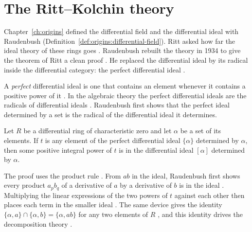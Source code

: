 \section{The Ritt--Kolchin theory}\label{sec:differential-algebra:ritt-kolchin}

Chapter~\ref{ch:origins} defined the differential field and the
differential ideal with Raudenbush
(Definition~\ref{def:origins:differential-field}). Ritt asked how far the
ideal theory of these rings goes \cite[p.~361]{Raudenbush1934}.
Raudenbush rebuilt the theory in 1934 to give the theorem of Ritt a
clean proof \cite[p.~361]{Raudenbush1934}. He replaced the differential
ideal by its radical inside
the differential category: the perfect differential ideal
\cite[p.~361]{Raudenbush1934}.

A \emph{perfect} differential ideal is one that contains an element
whenever it contains a positive power of it
\cite[p.~362]{Raudenbush1934}. In the algebraic theory the perfect
differential ideals are the radicals of differential ideals
\cite[p.~362]{Raudenbush1934}. Raudenbush first shows that the perfect
ideal determined by a set is the radical of the differential ideal it
determines.

\begin{theorem}\label{thm:diffalg:perfect-is-radical}
Let $R$ be a differential ring of characteristic zero and let
$\alpha$ be a set of its elements. If $t$ is any element of the perfect
differential ideal $\{\alpha\}$ determined by $\alpha$, then some
positive integral power of $t$ is in the differential ideal $[\alpha]$
determined by $\alpha$.
\end{theorem}

The proof uses the product rule
\cite[p.~363]{Raudenbush1934}. From $ab$ in the ideal, Raudenbush first
shows every product $a_pb_q$ of a derivative of $a$ by a derivative of
$b$ is in the ideal \cite[p.~363]{Raudenbush1934}. Multiplying the
linear expressions of the two powers of $t$ against each other then
places each term in the smaller ideal \cite[p.~363]{Raudenbush1934}.
The same device gives the identity
$\{\alpha, a\}\cap\{\alpha,b\} = \{\alpha, ab\}$ for any two elements of
$R$ \cite[Theorem~2, p.~363]{Raudenbush1934}, and this identity drives
the decomposition theory \cite[p.~365]{Raudenbush1934}.

